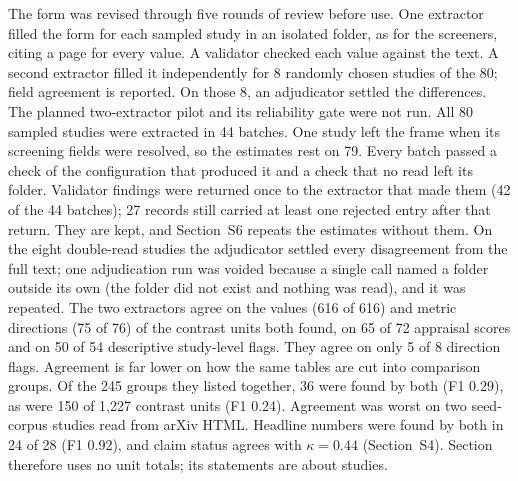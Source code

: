 \documentclass[acmsmall,screen]{acmart}
\makeatletter
\newcommand{\Mref}[1]{\@ifundefined{mr@#1}{\textbf{??}}{\csname mr@#1\endcsname}}
\makeatother
\begin{document}
The form was revised through five rounds of review before use. %
One extractor filled the form for each sampled study in an isolated folder, as for the screeners, citing a page for every value. A validator checked each value against the text. A second extractor filled it independently for 8 randomly chosen studies of the 80; field agreement is reported. On those 8, an adjudicator settled the differences. %
The planned two-extractor pilot and its reliability gate were not run.
All 80 sampled studies were extracted in 44 batches. One study left the frame when its screening fields were resolved, so the estimates rest on 79. Every batch passed a check of the configuration that produced it and a check that no read left its folder. Validator findings were returned once to the extractor that made them (42 of the 44 batches); 27 records still carried at least one rejected entry after that return. They are kept, and Section~S6 repeats the estimates without them. %
On the eight double-read studies the adjudicator settled every disagreement from the full text; one adjudication run was voided because a single call named a folder outside its own (the folder did not exist and nothing was read), and it was repeated. The two extractors agree on the values (616 of 616) and metric directions (75 of 76) of the contrast units both found, on 65 of 72 appraisal scores and on 50 of 54 descriptive study-level flags. They agree on only 5 of 8 direction flags. Agreement is far lower on how the same tables are cut into comparison groups. Of the 245 groups they listed together, 36 were found by both (F1 0.29), as were 150 of 1,227 contrast units (F1 0.24). Agreement was worst on two seed-corpus studies read from arXiv HTML. Headline numbers were found by both in 24 of 28 (F1 0.92), and claim status agrees with $\kappa=0.44$ (Section~S4). Section~\Mref{sec:rq} therefore uses no unit totals; its statements are about studies. %
\end{document}
